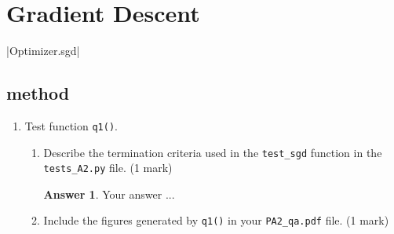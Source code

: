 \documentclass{article}
\theoremstyle{definition}
\newtheorem*{answer}{Answer}
\begin{document}
\section{Gradient Descent}
|Optimizer.sgd|
\subsection{ method}\label{partsgd}
\begin{enumerate}[label=\ref{partsgd}.\alph*]
	\item \label{q11a}Test function \verb|q1()|.
	\begin{enumerate}[label=\ref{q11a}.\roman*]
		\item Describe the termination criteria used in the \verb|test_sgd| function in the \verb|tests_A2.py| file. (1 mark)
		\begin{answer}
			Your answer ...
		\end{answer}
		\item Include the figures generated by \verb|q1()| in your \verb|PA2_qa.pdf| file. (1 mark)


\end{enumerate}
\end{enumerate}
\end{document}
